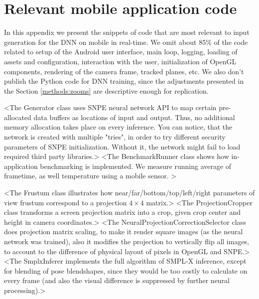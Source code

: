 \chapter{Relevant mobile application code}

In this appendix we present the snippets of code that are most relevant to input generation for the DNN on mobile in real-time. We omit about 85\% of the code related to setup of the Android user interface, main loop, logging, loading of assets and configuration, interaction with the user, initialization of OpenGL components, rendering of the camera frame, tracked planes, etc. We also don't publish the Python code for DNN training, since the adjustments presented in the Section \ref{methods:zooms} are descriptive enough for replication.


<The Generator class uses SNPE neural network API to map certain pre-allocated data buffers as locations of input and output. Thus, no additional memory allocation takes place on every inference. You can notice, that the network is created with multiple "tries", in order to try different security parameters of SNPE initialization. Without it, the network might fail to load required third party libraries.>
<The BenchmarkRunner class shows how in-application benchmarking is implemented. We measure running average of frametime, as well temperature using a mobile sensor. >


<The Frustum class illustrates how near/far/bottom/top/left/right parameters of view frustum correspond to a projection $4\times4$ matrix.>
<The ProjectionCropper class transforms a screen projection matrix into a crop, given crop center and height in camera coordinates.>
<The NeuralProjectionCorrectionSelector class does projection matrix scaling, to make it render square images (as the neural network was trained), also it modifies the projection to vertically flip all images, to account to the difference of physical layout of pixels in OpenGL and SNPE.>
<The SmplxInferer implements the full algorithm of SMPL-X inference, except for blending of pose blendshapes, since they would be too costly to calculate on every frame (and also the visual difference is suppressed by further neural processing).>

